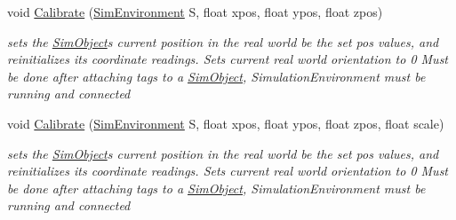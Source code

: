 \begin{DoxyCompactItemize}
void \hyperlink{class_pozyx_positioner_1_1_framework_1_1_sim_object_a0018cc8c8c91d0e32bec8c59b2459cd2}{Calibrate} (\hyperlink{class_pozyx_positioner_1_1_framework_1_1_sim_environment}{Sim\+Environment} S, float xpos, float ypos, float zpos)
\begin{DoxyCompactList}\small\item\em sets the \hyperlink{class_pozyx_positioner_1_1_framework_1_1_sim_object}{Sim\+Object}\textquotesingle{}s current position in the real world be the set pos values, and reinitializes its coordinate readings. Sets current real world orientation to 0 Must be done after attaching tags to a \hyperlink{class_pozyx_positioner_1_1_framework_1_1_sim_object}{Sim\+Object}, Simulation\+Environment must be running and connected \end{DoxyCompactList}\item 
void \hyperlink{class_pozyx_positioner_1_1_framework_1_1_sim_object_a1dc9505026ffbfb922eb41c1a8bb9858}{Calibrate} (\hyperlink{class_pozyx_positioner_1_1_framework_1_1_sim_environment}{Sim\+Environment} S, float xpos, float ypos, float zpos, float scale)
\begin{DoxyCompactList}\small\item\em sets the \hyperlink{class_pozyx_positioner_1_1_framework_1_1_sim_object}{Sim\+Object}\textquotesingle{}s current position in the real world be the set pos values, and reinitializes its coordinate readings. Sets current real world orientation to 0 Must be done after attaching tags to a \hyperlink{class_pozyx_positioner_1_1_framework_1_1_sim_object}{Sim\+Object}, Simulation\+Environment must be running and connected \end{DoxyCompactList}\end{DoxyCompactItemize}
